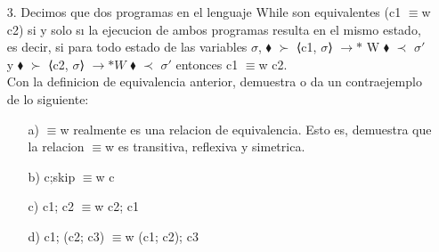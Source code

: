 \documentclass{article}
\begin{document}
\begin{itemize}
        \item[3.] Decimos que dos programas en el lenguaje While son equivalentes (c1 $\equiv$w c2) si y solo sı la ejecucion de ambos programas resulta en el mismo estado, es decir, si para todo estado de las variables $\sigma$, $\blacklozenge$ $\succ$  ⟨c1, $\sigma$⟩ $\rightarrow{*}$ W $\blacklozenge$ $\prec$ $\sigma'$ y $\blacklozenge$ $\succ$ ⟨c2, $\sigma$⟩ $\longrightarrow*W$ $\blacklozenge$ $\prec$ $\sigma'$ entonces c1 $\equiv$w c2.\\
        Con la definicion de equivalencia anterior, demuestra o da un contraejemplo de lo siguiente:
        \begin{itemize}
            \item[a)] $\equiv$w realmente es una relacion de equivalencia. Esto es, demuestra que la relacion $\equiv$w es transitiva, reflexiva y simetrica.
            \item[b)] c;skip $\equiv$w c
            \item[c)] c1; c2 $\equiv$w c2; c1
            \item[d)] c1; (c2; c3) $\equiv$w (c1; c2); c3 
        \end{itemize}
    \end{itemize}
\end{document}
